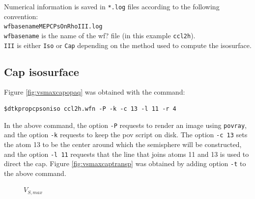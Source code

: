 Numerical information is saved in \texttt{*.log} files according to the
following convention:\\
\texttt{wfbasename{\color{blue}MEPCPsOnRho}{\color{red}III}.log}\\
\texttt{wfbasename} is the name of the wf? file (in this example \texttt{ccl2h}).\\
\texttt{\color{red}III} is either \texttt{Iso} or \texttt{Cap} depending on the method
used to compute the isosurface.

\subsection{Cap isosurface}
Figure \ref{fig:vsmaxcapopaq} was obtained with the command:
\begin{lstlisting}
$dtkpropcpsoniso ccl2h.wfn -P -k -c 13 -l 11 -r 4
\end{lstlisting}
In the above command, the option \texttt{-P} requests to render an image using \texttt{povray},
and the option \texttt{-k} requests to keep the pov script on disk. The option \texttt{-c 13} sets
the atom 13 to be the center around which the semisphere will be constructed, and the option
\texttt{-l 11} requests that the line that joins atoms 11 and 13 is used to direct the cap.
Figure \ref{fig:vsmaxcaptransp} was obtained by adding option \texttt{-t} to the above command.
%
\begin{figure}[ht!]
\centering
{}
\caption{$V_{S,max}$}\label{fig:vsmaxcap}
\end{figure}
%

